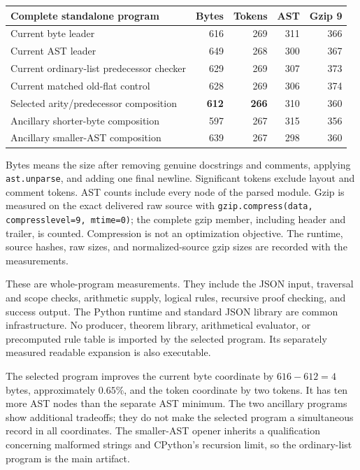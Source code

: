 \documentclass[11pt,letterpaper]{article}
\theoremstyle{definition}\newtheorem{definition}[theorem]{Definition}
\theoremstyle{remark}\newtheorem{remark}[theorem]{Remark}
\begin{document}
\begin{center}\small
\begin{tabular}{lrrrr}
\toprule
Complete standalone program & Bytes & Tokens & AST & Gzip 9\\
\midrule
Current byte leader &616&269&311&366\\
Current AST leader &649&268&300&367\\
Current ordinary-list predecessor checker &629&269&307&373\\
Current matched old-flat control &628&269&306&374\\
\midrule
Selected arity/predecessor composition &\textbf{612}&\textbf{266}&310&360\\
Ancillary shorter-byte composition &597&267&315&356\\
Ancillary smaller-AST composition &639&267&298&360\\
\bottomrule
\end{tabular}
\end{center}

Bytes means the size after removing genuine docstrings and comments,
applying \texttt{ast.unparse}, and adding one final newline. Significant
tokens exclude layout and comment tokens. AST counts include every node
of the parsed module. Gzip is measured on the exact delivered raw source
with \texttt{gzip.compress(data, compresslevel=9, mtime=0)}; the complete
gzip member, including header and trailer, is counted. Compression is
not an optimization objective. The runtime, source hashes, raw sizes,
and normalized-source gzip sizes are recorded with the measurements.

These are whole-program measurements. They include the JSON input,
traversal and scope checks, arithmetic supply, logical rules, recursive
proof checking, and success output. The Python runtime and standard JSON
library are common infrastructure. No producer, theorem library,
arithmetical evaluator, or precomputed rule table is imported by the
selected program. Its separately measured readable expansion is also
executable.

The selected program improves the current byte coordinate by
$616-612=4$ bytes, approximately $0.65\%$, and the token coordinate by
two tokens. It has ten more AST nodes than the separate AST minimum.
The two ancillary programs show additional tradeoffs; they do not make
the selected program a simultaneous record in all coordinates.
The smaller-AST opener inherits a qualification concerning malformed
strings and CPython's recursion limit, so the ordinary-list program is
the main artifact.
\end{document}
